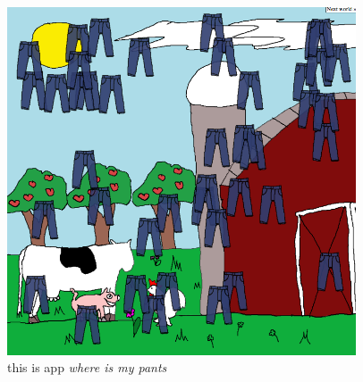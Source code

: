 \documentclass[twocolumn]{article}
\begin{document}
\begin{figure}[t]
\begin{center}
\includegraphics[width=0.92\textwidth]{screenshot}
\end{center}
\caption{this is app {\it where is my pants} }
\end{figure}
\end{document}
